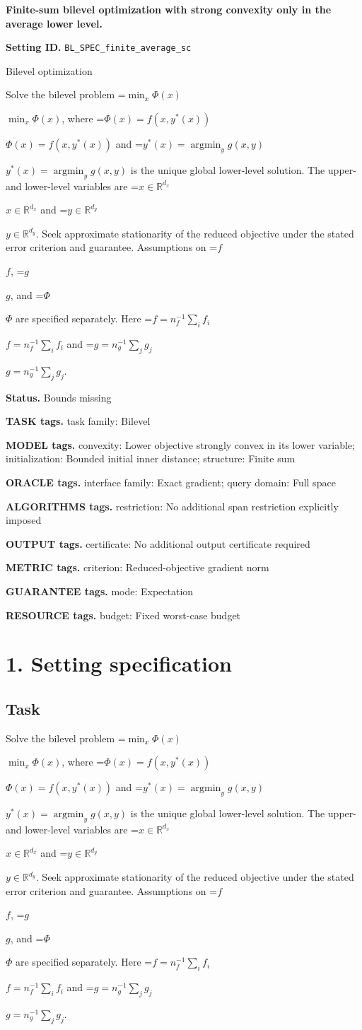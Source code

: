 \documentclass[10pt,a4paper]{article}
\newcommand{\AtlasMath}[1]{\par\begingroup\centering\setbox0=\hbox{$\displaystyle #1$}\ifdim\wd0>1.4\linewidth\typeout{ATLAS WIDE FORMULA: \the\wd0}\fi\ifdim\wd0>\linewidth\resizebox{\linewidth}{!}{\box0}\else\box0\fi\par\endgroup}
\newcommand{\AtlasInlineMath}[1]{\begingroup\setbox0=\hbox{$#1$}\ifdim\wd0>.4\linewidth\endgroup\AtlasMath{#1}\else\endgroup$#1$\fi}
\begin{document}
\raggedright

{\LARGE\bfseries\sffamily\color{AtlasNavy} Finite-sum bilevel optimization with strong convexity only in the average lower level.\par}\vspace{5pt}
\textbf{Setting ID.} \texttt{BL\_\allowbreak{}SPEC\_\allowbreak{}finite\_\allowbreak{}average\_\allowbreak{}sc}

Bilevel optimization

Solve the bilevel problem \AtlasInlineMath{\min_x\Phi(x)}, where \AtlasInlineMath{\Phi(x)=f(x,y^*(x))} and \AtlasInlineMath{y^*(x)=\operatorname*{argmin}_y g(x,y)} is the unique global lower-level solution. The upper- and lower-level variables are \AtlasInlineMath{x\in\mathbb{R}^{d_x}} and \AtlasInlineMath{y\in\mathbb{R}^{d_y}}. Seek approximate stationarity of the reduced objective under the stated error criterion and guarantee. Assumptions on \AtlasInlineMath{f}, \AtlasInlineMath{g}, and \AtlasInlineMath{\Phi} are specified separately. Here \AtlasInlineMath{f=n_f^{-1}\sum_i f_i} and \AtlasInlineMath{g=n_g^{-1}\sum_jg_j}.

\textbf{Status.} Bounds missing

\textbf{TASK tags.} task family: Bilevel

\textbf{MODEL tags.} convexity: Lower objective strongly convex in its lower variable; initialization: Bounded initial inner distance; structure: Finite sum

\textbf{ORACLE tags.} interface family: Exact gradient; query domain: Full space

\textbf{ALGORITHMS tags.} restriction: No additional span restriction explicitly imposed

\textbf{OUTPUT tags.} certificate: No additional output certificate required

\textbf{METRIC tags.} criterion: Reduced-objective gradient norm

\textbf{GUARANTEE tags.} mode: Expectation

\textbf{RESOURCE tags.} budget: Fixed worst-case budget

\section{1. Setting specification}
\subsection{Task}
Solve the bilevel problem \AtlasInlineMath{\min_x\Phi(x)}, where \AtlasInlineMath{\Phi(x)=f(x,y^*(x))} and \AtlasInlineMath{y^*(x)=\operatorname*{argmin}_y g(x,y)} is the unique global lower-level solution. The upper- and lower-level variables are \AtlasInlineMath{x\in\mathbb{R}^{d_x}} and \AtlasInlineMath{y\in\mathbb{R}^{d_y}}. Seek approximate stationarity of the reduced objective under the stated error criterion and guarantee. Assumptions on \AtlasInlineMath{f}, \AtlasInlineMath{g}, and \AtlasInlineMath{\Phi} are specified separately. Here \AtlasInlineMath{f=n_f^{-1}\sum_i f_i} and \AtlasInlineMath{g=n_g^{-1}\sum_jg_j}.
\end{document}
